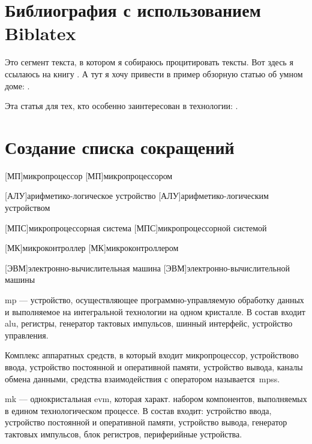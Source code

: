 \documentclass[a4paper, 14pt]{extarticle}
\begin{document}
    \graphicspath{{images/}{images2/}} %

    \author{М.А.Гейне}
    \bmstutitlelab

    \section{Библиография с использованием Biblatex}
    Это сегмент текста, в котором я собираюсь процитировать тексты. Вот здесь я ссылаюсь на книгу \cite{harper2006inside}.
    А тут я хочу привести в пример обзорную статью об умном доме: \cite{suresh2015review}.

    Эта статья для тех, кто особенно заинтересован в технологии: \cite{sripan2012research}.
    \nocite{robles2010applications}
    
    \printbibliography

    \section{Создание списка сокращений}

    \begin{acronym}
        [МП]{микропроцессор}
        [МП]{микропроцессором}
        
        [АЛУ]{арифметико-логическое устройство}
        [АЛУ]{арифметико-логическим устройством}

        [МПС]{микропроцессорная система}
        [МПС]{микропроцессорной системой}

        [МК]{микроконтроллер}
        [МК]{микроконтроллером}

        [ЭВМ]{электронно-вычислительная машина}
        [ЭВМ]{электронно-вычислительной машины}
    \end{acronym}

    \Acl{mp} –-- устройство, осуществляющее программно-управляемую
     обработку данных и выполняемое на интегральной технологии на одном кристалле. 
     В состав входит \ac{alu}, регистры, генератор тактовых импульсов, шинный интерфейс, 
     устройство управления.
    
    Комплекс аппаратных средств, в который входит микропроцессор, устройствово ввода, 
    устройство постоянной и оперативной памяти, устройство вывода, каналы обмена данными, 
    средства взаимодействия с оператором называется~\acp{mps}.

    \Acl{mk} –-- однокристальная \acs{evm}, которая характ. набором  компонентов, выполняемых
     в едином технологическом процессе. В состав входит: устройство ввода, устройство постоянной
     и оперативной памяти, устройство вывода, генератор тактовых импульсов, блок регистров, периферийные устройства.

    \tableofcontents
\end{document}

